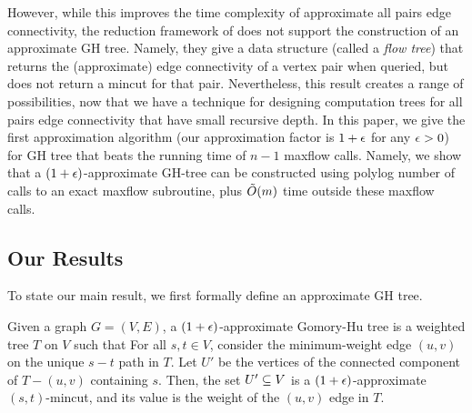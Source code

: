 However, while this improves the time complexity of approximate all pairs edge connectivity, the reduction framework of\linebreak \cite{AbboudKT20b} does not support the construction of an approximate GH tree. Namely, they give a data structure (called a {\em flow tree}) that returns the (approximate) edge connectivity of a vertex pair when queried, but does not return a mincut for that pair. Nevertheless, this result creates a range of possibilities, now that we have a technique for designing computation trees for all pairs edge connectivity that have small recursive depth. In this paper, we give the first approximation algorithm (our approximation factor is $1+\epsilon$ for any $\epsilon>0$) for GH tree that beats the running time of $n-1$ maxflow calls. Namely, we show that a $(1+\epsilon)$-approximate GH-tree can be constructed using polylog number of calls to an exact maxflow subroutine, plus $\tilde{O}(m)$ time outside these maxflow calls.

\subsection{Our Results}


To state our main result, we first formally define an approximate GH tree. 

Given a graph $G=(V,E)$, a $(1+\epsilon)$-approximate Gomory-Hu tree is a weighted tree $T$ on $V$ such that
 \BI
 \im For all $s,t\in V$, consider the minimum-weight edge $(u,v)$ on the unique $s-t$ path in $T$. Let $U'$ be the vertices of the connected component of $T-(u,v)$ containing $s$.
Then, the set $U'\subseteq V$ is a $(1+\epsilon)$-approximate $(s,t)$-mincut, and its value is the weight of the $(u, v)$ edge in $T$.
 \EI
\ED

